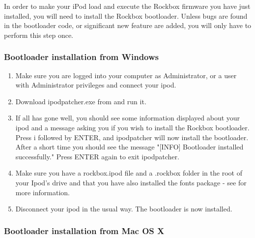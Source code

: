 

In order to make your iPod load and execute the Rockbox firmware you
have just installed, you will need to install the Rockbox
bootloader. Unless bugs are found in the bootloader code, or
significant new feature are added, you will only have to perform this
step once.

\subsubsection{Bootloader installation from Windows}

\begin{enumerate}

\item Make sure you are logged into your computer as Administrator, or a 
user with Administrator privileges and connect your ipod.

\item Download ipodpatcher.exe from 
and run it.

\item If all has gone well, you should see some information displayed about
your ipod and a message asking you if you wish to install the Rockbox
bootloader. Press i followed by ENTER, and ipodpatcher will now
install the bootloader. After a short time you should see the message
"[INFO] Bootloader installed successfully." Press ENTER again to exit
ipodpatcher.

\item Make sure you have a rockbox.ipod file and a .rockbox folder in the 
root of your Ipod's drive and that you have also installed the fonts
package - see  for more information.

\item Disconnect your ipod in the usual way. The bootloader is now installed. 

\end{enumerate}

\subsubsection{Bootloader installation from Mac OS X}

